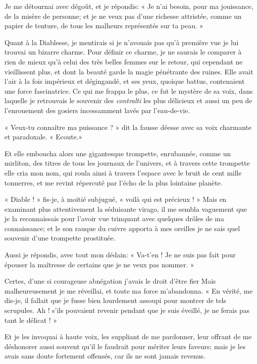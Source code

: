Je me détournai avec dégoût, et je répondis: « Je n’ai
besoin, pour ma jouissance, de la misère de personne; et je ne veux pas
d’une richesse attristée, comme un papier de tenture,
de tous les malheurs représentés sur ta peau. »

Quant à la Diablesse, je mentirais si je n’avouais pas
qu’à première vue je lui trouvai un bizarre charme.
Pour définir ce charme, je ne saurais le comparer à rien de mieux
qu’à celui des très belles femmes sur le retour, qui
cependant ne vieillissent plus, et dont la beauté garde la magie
pénétrante des ruines. Elle avait l’air à la fois
impérieux et dégingandé, et ses yeux, quoique battus, contenaient une
force fascinatrice. Ce qui me frappa le plus, ce fut le mystère de sa
voix, dans laquelle je retrouvais le souvenir des \textit{contralti} les plus
délicieux et aussi un peu de l’enrouement des gosiers
incessamment lavés par l’eau{}-de{}-vie.

« Veux{}-tu connaître ma puissance ? » dit la fausse déesse avec sa voix
charmante et paradoxale. « Ecoute.»

Et elle emboucha alors une gigantesque trompette, enrubannée, comme un
mirliton, des titres de tous les journaux de
l’univers, et à travers cette trompette elle cria mon
nom, qui roula ainsi à travers l’espace avec le bruit
de cent mille tonnerres, et me revint répercuté par
l’écho de la plus lointaine planète.

« Diable ! » fis{}-je, à moitié subjugué, « voilà qui est précieux ! »
Mais en examinant plus attentivement la séduisante virago, il me sembla
vaguement que je la reconnaissais pour l’avoir vue
trinquant avec quelques drôles de ma connaissance; et le son rauque du
cuivre apporta à mes oreilles je ne sais quel souvenir
d’une trompette prostituée.

Aussi je répondis, avec tout mon dédain: « Va{}-t’en !
Je ne suis pas fait pour épouser la maîtresse de certains que je ne
veux pas nommer. »

Certes, d’une si courageuse abnégation
j’avais le droit d’être fier Mais
malheureusement je me réveillai, et toute ma force
m’abandonna. « En vérité, me dis{}-je, il fallait que
je fusse bien lourdement assoupi pour montrer de tels scrupules. Ah !
s’ils pouvaient revenir pendant que je suis éveillé,
je ne ferais pas tant le délicat ! »

Et je les invoquai à haute voix, les suppliant de me pardonner, leur
offrant de me déshonorer aussi souvent qu’il le
faudrait pour mériter leurs faveurs; mais je les avais sans doute
fortement offensés, car ils ne sont jamais revenus.

